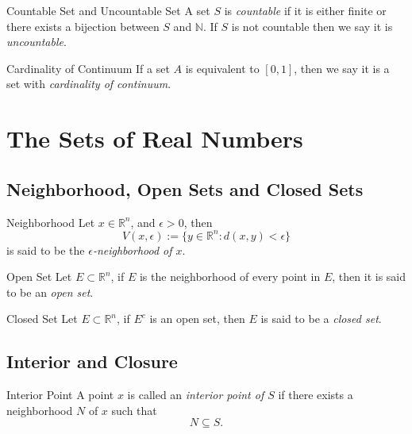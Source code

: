 \begin{definition}{Countable Set and Uncountable Set}{}
  A set $S$ is \emph{countable} if it is either finite or there
  exists a bijection between $S$ and $\mathbb{N}$.
  If $S$ is not countable then we say it is \emph{uncountable}.
\end{definition}

\begin{definition}{Cardinality of Continuum}{}
  If a set $A$ is equivalent to $[0, 1]$,
  then we say it is a set with \emph{cardinality of continuum}.
\end{definition}

\section{The Sets of Real Numbers}

\subsection{Neighborhood, Open Sets and Closed Sets}

\begin{definition}{Neighborhood}{}
  Let $x \in \mathbb{R}^n$, and $\epsilon > 0$, then 
  \begin{equation}
    V(x, \epsilon) := \{y \in \mathbb{R}^n: d(x,y) < \epsilon\}
  \end{equation}
  is said to be the \emph{$\epsilon$-neighborhood of $x$}.
\end{definition}

\begin{definition}{Open Set}{}
  Let $E \subset \mathbb{R}^n$, if $E$ is the neighborhood of every point in
  $E$,
  then it is said to be an \emph{open set}.
\end{definition}

\begin{definition}{Closed Set}{}
  Let $E \subset \mathbb{R}^n$, if $E^c$ is an open set,
  then $E$ is said to be a \emph{closed set}.
\end{definition}

\subsection{Interior and Closure}

\begin{definition}{Interior Point}{}
  A point $x$ is called an \emph{interior point of $S$} if there exists a
  neighborhood $N$ of $x$ such that
  \begin{equation}
    N \subseteq S.
  \end{equation}
\end{definition}




